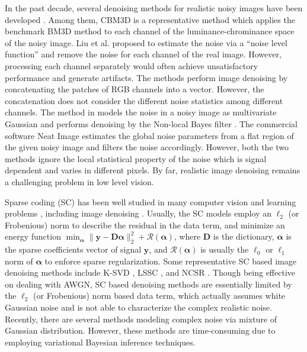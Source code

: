 In the past decade, several denoising methods for realistic noisy images have been developed \cite{cbm3d,Liu2008,noiseclinic,Zhu_2016_CVPR,
crosschannel2016,neatimage}. Among them, CBM3D \cite{cbm3d} is a representative method which applies the benchmark BM3D method \cite{bm3d} to each channel of the luminance-chrominance space of the noisy image. Liu et al. \cite{Liu2008} proposed to estimate the noise via a ``noise level function'' and remove the noise for each channel of the real image. However, processing each channel separately would often achieve unsatisfactory performance and generate artifacts. The methods \cite{noiseclinic,Zhu_2016_CVPR} perform image denoising by concatenating the patches of RGB channels into a vector. However, the concatenation does not consider the different noise statistics among different channels. The method in \cite{crosschannel2016} models the noise in a noisy image as multivariate Gaussian and performs denoising by the Non-local Bayes filter \cite{noiseclinic}. The commercial software Neat Image \cite{neatimage} estimates the global noise parameters from a flat region of the given noisy image and filters the noise accordingly. However, both the two methods \cite{crosschannel2016,neatimage} ignore the local statistical property of the noise which is signal dependent and varies in different pixels. By far, realistic image denoising remains a challenging problem in low level vision.  

Sparse coding (SC) \cite{lasso} has been well studied in many computer vision and learning problems \cite{src,yang2010image}, including image denoising \cite{ksvd,lssc,ncsr}. Usually, the SC models employ an $\ell_{2}$ (or Frobenious) norm to describe the residual in the data term, and minimize an energy function 
$
\min_{\bm{\alpha}}
\|
\bm{y}-\bm{D}\bm{\alpha}
\|_{2}^{2}
+
\mathcal{R}(\bm{\alpha})
$, where $\bm{D}$ is the dictionary, $\bm{\alpha}$ is the sparse coefficients vector of signal $\bm{y}$, and $\mathcal{R}(\bm{\alpha})$ is usually the $\ell_{0}$ or $\ell_{1}$ norm of $\bm{\alpha}$ to enforce sparse regularization. Some representative SC based image denoising methods include K-SVD \cite{ksvd}, LSSC \cite{lssc}, and NCSR \cite{ncsr}. Though being effective on dealing with AWGN, SC based denoising methods are essentially limited by the $\ell_{2}$ (or Frobenious) norm based data term, which actually assumes white Gaussian noise and is not able to characterize the complex realistic noise. Recently, there are several methods \cite{Zhu_2016_CVPR,zhao2014robust} modeling complex noise via mixture of Gaussian distribution. However, these methods \cite{Zhu_2016_CVPR,zhao2014robust} are time-consuming due to employing variational Bayesian inference techniques.

